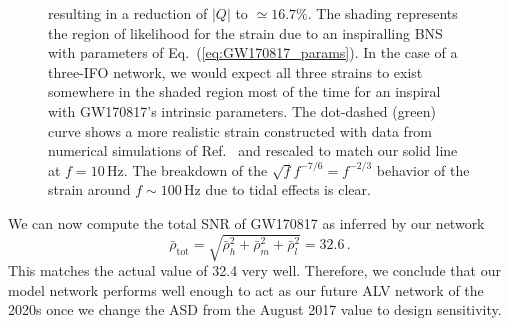 \documentclass[prd,amsmath,amssymb,aps,floats,amsfonts,notitlepage,superscriptaddress,eqsecnum,nofootinbib,10pt]{revtex4-1}
\newcommand{\be}{\begin{equation}}
\newcommand{\ee}{\end{equation}}
\begin{document}
\begin{figure}[ht!]
{resulting in a reduction of $|Q|$ to $\simeq 16.7\%$.
The shading represents the region of likelihood for the strain due to an inspiralling BNS with parameters of Eq.~(\ref{eq:GW170817_params}). In the case of a three-IFO
network, we would expect all three strains to exist somewhere in the shaded region most of the time for an inspiral with GW170817's intrinsic parameters. %
The dot-dashed (green) curve shows a more realistic strain constructed with data from numerical simulations of Ref.~\cite{Read:2009yp}
and rescaled to match our solid line at $f=10\,$Hz.
The breakdown of the $\sqrt{f}f^{-7/6}=f^{-2/3}$ behavior of
the strain around $f\sim100\,$Hz due to tidal effects is clear.
}
\label{fig:figGW170817}
\end{figure}
%
%

We can now compute the total SNR of GW170817 as inferred by our network
%
\be
\bar\rho_\text{tot}= \sqrt{\bar\rho^2_h+\bar\rho^2_m+\bar\rho^2_l}= 32.6 \, \label{eq:SNR_total_GW170817} .
\ee
%
This matches the actual value of 32.4 very well. Therefore, we conclude that our model network performs well enough to 
act as our future ALV network of the 2020s once we change
the ASD from the August 2017 value to design sensitivity.
%
%
%
%
%
\end{document}
